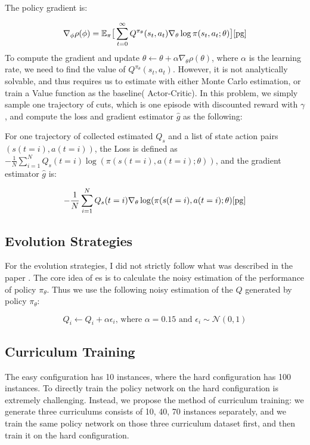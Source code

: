 \documentclass{article}
\begin{document}
The policy gradient is: 

$$\nabla_\phi \rho(\phi) = \mathbb{E}_{\pi} \big[\sum_{t=0}^\infty Q^{\pi_\theta}(s_t,a_t) \nabla_\theta \log \pi(s_t, a_t ; \theta) \big]\cite{pg}$$
To compute the gradient and update $\theta \leftarrow \theta + \alpha \nabla_\theta \rho(\theta)$, where $\alpha$ is the learning rate, we need to find the value of
 $Q^{\pi_\theta}(s_t,a_t)$. However, it is not analytically solvable, and thus requires us to estimate with either Monte Carlo estimation, or train a Value function as the baseline( Actor-Critic). In this problem, we simply sample one trajectory of cuts, which is one episode with discounted reward with $\gamma$, and compute the loss and gradient estimator $\hat g$ as the following: 

For one trajectory of collected estimated $Q_s$ and a list of state action pairs $(s(t = i), a(t = i))$, the Loss is defined as $-\frac{1}{N} \sum_{i=1}^N Q_s(t = i) \log(\pi(s(t = i), a(t = i) ; \theta)) $, and the gradient estimator $\hat g$ is:

$$- \frac{1}{N} \sum_{i=1}^N Q_s(t = i)  \nabla_\theta \log(\pi(s(t = i), a(t = i) ; \theta)\cite{pg} $$

\subsection{Evolution Strategies}
For the evolution strategies, I did not strictly follow what was described in the paper \cite{rlcut}. The core idea of es is to calculate the noisy estimation of the performance of policy $\pi_\theta$. Thus we use the following noisy estimation of the $Q$ generated by policy $\pi_\theta$:

$$Q_i \leftarrow Q_i + \alpha \epsilon_i \text{, where } \alpha = 0.15 \text{ and } \epsilon_i \sim \mathcal{N}(0,1)$$

\subsection{Curriculum Training}

The easy configuration has 10 instances, where the hard configuration has 100 instances. To directly train the policy network on the hard configuration is extremely challenging. Instead, we propose the method of curriculum training: we generate three curriculums consists of 10, 40, 70 instances separately, and we train the same policy network on those three curriculum dataset first, and then train it on the hard configuration.
\end{document}
